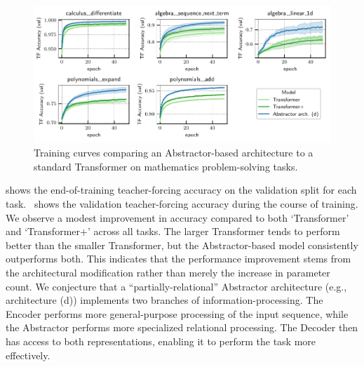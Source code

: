 \begin{figure}[t]
    \centering
    \includegraphics[width=\textwidth]{figures/experiments/math_training_curves.pdf}
    \caption{Training curves comparing an Abstractor-based architecture to a standard Transformer on mathematics problem-solving tasks.}\label{fig:math_training_curves}
\end{figure}

 shows the end-of-training teacher-forcing accuracy on the validation split for each task.~ shows the validation teacher-forcing accuracy during the course of training. We observe a modest improvement in accuracy compared to both `Transformer' and `Transformer+' across all tasks. The larger Transformer tends to perform better than the smaller Transformer, but the Abstractor-based model consistently outperforms both. This indicates that the performance improvement stems from the architectural modification rather than merely the increase in parameter count. We conjecture that a ``partially-relational'' Abstractor architecture (e.g., architecture (d)) implements two branches of information-processing. The Encoder performs more general-purpose processing of the input sequence, while the Abstractor performs more specialized relational processing. The Decoder then has access to both representations, enabling it to perform the task more effectively.
